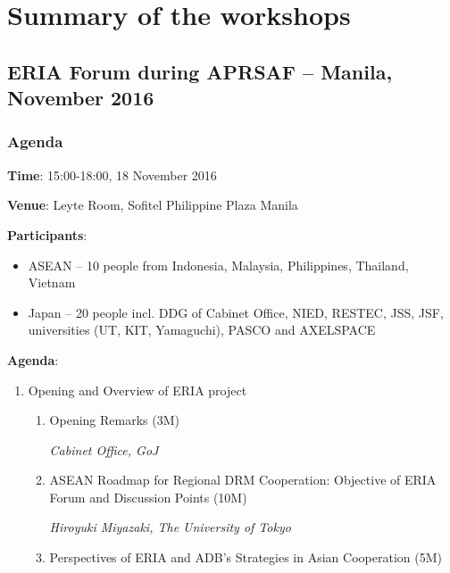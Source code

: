\chapter{Summary of the workshops}


\section{ERIA Forum during APRSAF -- Manila, November 2016}

\subsection{Agenda}

{\flushleft

\textbf{Time}: 15:00-18:00, 18 November 2016

\vspace{0.4 cm}

\textbf{Venue}: Leyte Room, Sofitel Philippine Plaza Manila

\vspace{0.4 cm}

\textbf{Participants}:

\begin{itemize}
\item ASEAN -- 10 people from Indonesia, Malaysia, Philippines, Thailand, Vietnam
\item Japan -- 20 people incl. DDG of Cabinet Office, NIED, RESTEC, JSS, JSF, universities (UT, KIT, Yamaguchi), PASCO and AXELSPACE
\end{itemize}

\vspace{0.4 cm}

\textbf{Agenda}:

\begin{enumerate}

\item Opening and Overview of ERIA project

	\begin{enumerate}
	\item Opening Remarks (3M)
	
	\textit{Cabinet Office, GoJ}
	\item ASEAN Roadmap for Regional DRM Cooperation: Objective of ERIA Forum and Discussion Points (10M)
	
	\textit{Hiroyuki Miyazaki, The University of Tokyo}
	\item Perspectives of ERIA and ADB's Strategies in Asian Cooperation (5M)
	

\end{enumerate}
\end{enumerate}}
